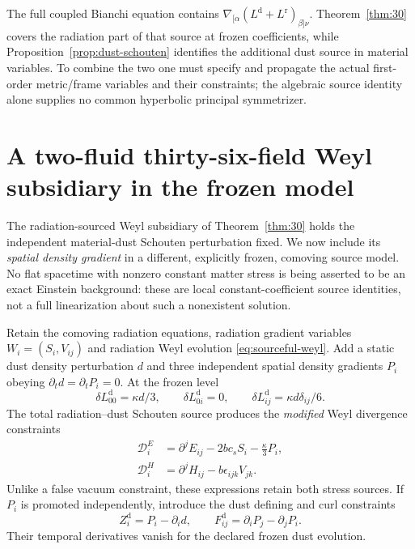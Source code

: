 \documentclass[11pt,a4paper]{article}
\begin{document}
The full coupled Bianchi equation
contains
$\nabla_{[\alpha}(L^{\mathrm d}
+L^{\mathrm r})_{\beta]\nu}$.
Theorem~\ref{thm:30} covers the
radiation part of that source
at frozen coefficients, while
Proposition~\ref{prop:dust-schouten}
identifies the additional
dust source in material variables.
To combine the two one must
specify and propagate the actual
first-order metric/frame
variables and their constraints;
the algebraic source identity
alone supplies no common
hyperbolic principal symmetrizer.


\section{A two-fluid thirty-six-field Weyl subsidiary in the frozen model}
\label{sec:twofluid36}
The radiation-sourced Weyl subsidiary of
Theorem~\ref{thm:30} holds the independent
material-dust Schouten perturbation fixed.
We now include its \emph{spatial density
gradient} in a different, explicitly
frozen, comoving source model.
No flat spacetime with nonzero constant
matter stress is being asserted to be
an exact Einstein background: these
are local constant-coefficient source
identities, not a full linearization
about such a nonexistent solution.

Retain the comoving radiation equations,
radiation gradient variables
$W_i=(S_i,V_{ij})$ and radiation Weyl
evolution \eqref{eq:sourceful-weyl}.
Add a static dust density perturbation
$d$ and three independent spatial
density gradients $P_i$ obeying
$\partial_t d=\partial_tP_i=0$.
At the frozen level
\[
\delta L^{\mathrm d}_{00}=\kappa d/3,\qquad
\delta L^{\mathrm d}_{0i}=0,\qquad
\delta L^{\mathrm d}_{ij}
=\kappa d\delta_{ij}/6.
\]
The total radiation--dust Schouten
source produces the \emph{modified}
Weyl divergence constraints
\begin{equation}\label{eq:twofluidCE}
\begin{aligned}
\mathcal D^E_i&=
\partial^jE_{ij}-2bc_sS_i-\frac\kappa3P_i,\\
\mathcal D^H_i&=
\partial^jH_{ij}-b\epsilon_{ijk}V_{jk}.
\end{aligned}
\end{equation}
Unlike a false vacuum constraint,
these expressions retain both stress
sources. If $P_i$ is promoted
independently, introduce the
dust defining and curl constraints
\begin{equation}\label{eq:dustZ}
Z_i^{\mathrm d}=P_i-\partial_i d,
\qquad F^{\mathrm d}_{ij}
=\partial_iP_j-\partial_jP_i.
\end{equation}
Their temporal derivatives vanish
for the declared frozen dust evolution.
\end{document}
